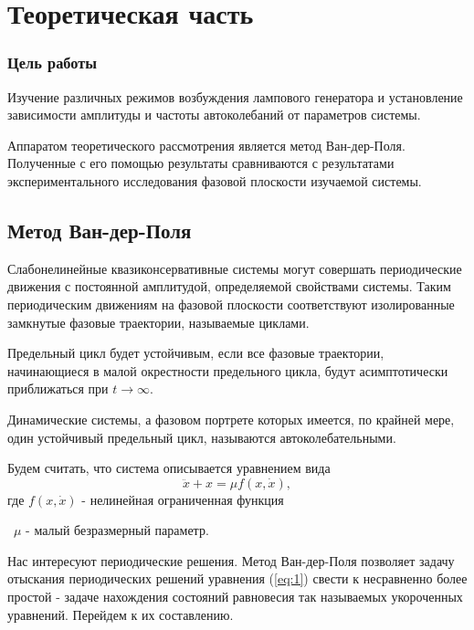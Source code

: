 




\def\labauthors{Войтович Д.А., Понур К.А.}
\def\labgroup{430}
\def\labnumber{2}
\def\labtheme{Фазовая плоскость лампового генератора}


\tableofcontents
\newpage




\section{Теоретическая часть}
\subsubsection*{Цель работы} Изучение различных режимов возбуждения лампового генератора и установление зависимости амплитуды и частоты автоколебаний от параметров системы.

Аппаратом теоретического рассмотрения является метод Ван-дер-Поля. Полученные с его помощью результаты сравниваются с результатами экспериментального исследования фазовой плоскости изучаемой системы. 
\subsection{ Метод Ван-дер-Поля}
Слабонелинейные квазиконсервативные системы могут совершать периодические движения с постоянной амплитудой, определяемой свойствами системы. Таким периодическим движениям на фазовой плоскости соответствуют изолированные замкнутые фазовые траектории, называемые { циклами}.

Предельный цикл будет устойчивым, если все фазовые траектории, начинающиеся в малой окрестности предельного цикла, будут асимптотически приближаться при $t\to\infty$.

Динамические системы, а фазовом портрете которых имеется, по крайней мере, один устойчивый предельный цикл, называются автоколебательными. 

Будем считать, что система описывается уравнением вида 
\begin{equation}
\label{eq:1}
\ddot{x}+x=\mu f(x,\dot{x}),
\end{equation}
где  $f(x,\dot{x})$ - нелинейная ограниченная функция 

~$\mu$ - малый безразмерный параметр.

Нас интересуют периодические решения. Метод Ван-дер-Поля позволяет задачу отыскания периодических решений уравнения (\ref{eq:1}) свести к несравненно более простой - задаче нахождения состояний равновесия так называемых укороченных уравнений. Перейдем к их составлению.

